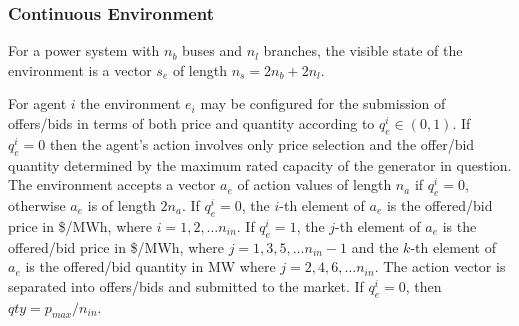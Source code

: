 \subsubsection{Continuous Environment}
For a power system with $n_b$ buses and $n_l$ branches, the visible state of
the environment is a vector $s_e$ of length $n_s = 2n_b + 2n_l$.

For agent $i$ the environment $e_i$ may be configured for the submission of
offers/bids in terms of both price and quantity according to $q_e^i \in (0,1)$.
If $q_e^i = 0$ then the agent's action involves only price selection and the
offer/bid quantity determined by the maximum rated capacity of the generator in
question.  The environment accepts a vector $a_e$ of action values of length
$n_a$ if $q_e^i = 0$, otherwise $a_e$ is of length $2n_a$.  If $q_e^i = 0$, the
$i$-th element of $a_e$ is the offered/bid price in \$/MWh, where $i = 1,2,\dotsc
n_{in}$.  If $q_e^i = 1$, the $j$-th element of $a_e$ is the offered/bid
price in \$/MWh, where $j = 1,3,5,\dotsc n_{in}-1$ and the $k$-th element of
$a_e$ is the offered/bid quantity in MW where $j = 2,4,6,\dotsc n_{in}$.  The
action vector is separated into offers/bids and submitted to the market.  If
$q_e^i = 0$, then $qty = p_{max}/n_{in}$.

